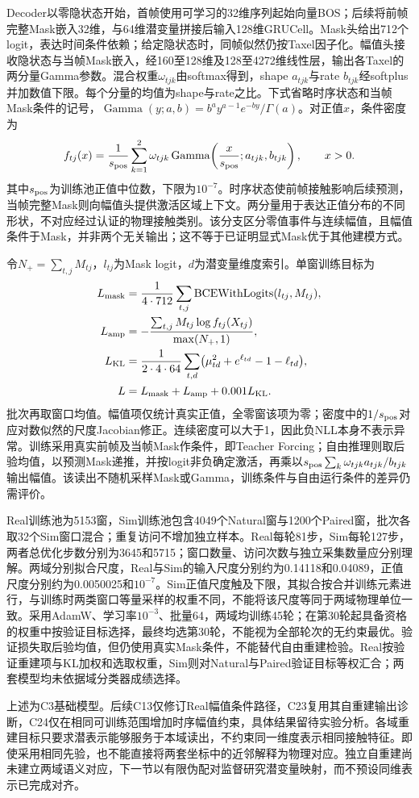 Decoder以零隐状态开始，首帧使用可学习的32维序列起始向量BOS；后续将前帧完整Mask嵌入32维，与64维潜变量拼接后输入128维GRUCell。Mask头给出712个logit，表达时间条件依赖；给定隐状态时，同帧似然仍按Taxel因子化。幅值头接收隐状态与当帧Mask嵌入，经160至128维及128至4272维线性层，输出各Taxel的两分量Gamma参数。混合权重$\omega_{tjk}$由softmax得到，shape $a_{tjk}$与rate $b_{tjk}$经softplus并加数值下限。每个分量的均值为shape与rate之比。下式省略时序状态和当帧Mask条件的记号，$\operatorname{Gamma}(y;a,b)=b^a y^{a-1}e^{-by}/\Gamma(a)$。对正值$x$，条件密度为
\begin{equation}
 f_{tj}(x)=\frac1{s_{\rm pos}}\sum_{k=1}^{2}\omega_{tjk}
 \operatorname{Gamma}\!\left(\frac{x}{s_{\rm pos}};a_{tjk},b_{tjk}\right),
 \qquad x>0.
 \label{eq:ch05_vae_gamma_mixture}
\end{equation}
其中$s_{\rm pos}$为训练池正值中位数，下限为$10^{-7}$。时序状态使前帧接触影响后续预测，当帧完整Mask则向幅值头提供激活区域上下文。两分量用于表达正值分布的不同形状，不对应经过认证的物理接触类别。该分支区分零值事件与连续幅值，且幅值条件于Mask，并非两个无关输出；这不等于已证明显式Mask优于其他建模方式。

令$N_+=\sum_{t,j}M_{tj}$，$l_{tj}$为Mask logit，$d$为潜变量维度索引。单窗训练目标为
\begin{equation}
 \begin{aligned}
 L_{\rm mask}&=\frac1{4\cdot712}\sum_{t,j}
 \operatorname{BCEWithLogits}(l_{tj},M_{tj}),\\
 L_{\rm amp}&=-\frac{\sum_{t,j}M_{tj}\log f_{tj}(X_{tj})}{\max(N_+,1)},\\
 L_{\rm KL}&=\frac1{2\cdot4\cdot64}\sum_{t,d}
 \bigl(\mu_{td}^{2}+e^{\ell_{td}}-1-\ell_{td}\bigr),\\
 L&=L_{\rm mask}+L_{\rm amp}+0.001L_{\rm KL}.
 \end{aligned}
 \label{eq:ch05_vae_objective}
\end{equation}
批次再取窗口均值。幅值项仅统计真实正值，全零窗该项为零；密度中的$1/s_{\rm pos}$对应对数似然的尺度Jacobian修正。连续密度可以大于1，因此负NLL本身不表示异常。训练采用真实前帧及当帧Mask作条件，即Teacher Forcing；自由推理则取后验均值，以预测Mask递推，并按logit非负确定激活，再乘以$s_{\rm pos}\sum_k\omega_{tjk}a_{tjk}/b_{tjk}$输出幅值。该读出不随机采样Mask或Gamma，训练条件与自由运行条件的差异仍需评价。

Real训练池为5153窗，Sim训练池包含4049个Natural窗与1200个Paired窗，批次各取32个Sim窗口混合；重复访问不增加独立样本。Real每轮81步，Sim每轮127步，两者总优化步数分别为3645和5715；窗口数量、访问次数与独立采集数量应分别理解。两域分别拟合尺度，Real与Sim的输入尺度分别约为0.14118和0.04089，正值尺度分别约为0.0050025和$10^{-7}$。Sim正值尺度触及下限，其拟合按合并训练元素进行，与训练时两类窗口等量采样的权重不同，不能将该尺度等同于两域物理单位一致。采用AdamW、学习率$10^{-3}$、批量64，两域均训练45轮；在第30轮起具备资格的权重中按验证目标选择，最终均选第30轮，不能视为全部轮次的无约束最优。验证损失取后验均值，但仍使用真实Mask条件，不能替代自由重建检验。Real按验证重建项与KL加权和选取权重，Sim则对Natural与Paired验证目标等权汇合；两套模型均未依据域分类器成绩选择。

上述为C3基础模型。后续C13仅修订Real幅值条件路径，C23复用其自重建输出诊断，C24仅在相同可训练范围增加时序幅值约束，具体结果留待实验分析。各域重建目标只要求潜表示能够服务于本域读出，不约束同一维度表示相同接触特征。即使采用相同先验，也不能直接将两套坐标中的近邻解释为物理对应。独立自重建尚未建立两域语义对应，下一节以有限伪配对监督研究潜变量映射，而不预设同维表示已完成对齐。
